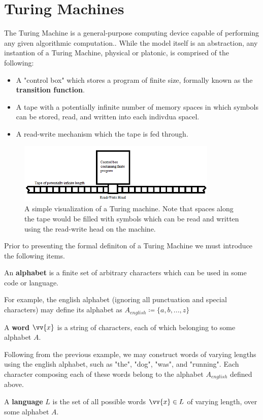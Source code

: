 \documentclass{article}
\begin{document}
\section{Turing Machines}
The Turing Machine is a general-purpose computing device capable of performing any given algorithmic computation.\cite{2}.  While the model itself is an abstraction, any instantion of a Turing Machine, physical or platonic, is comprised of the following:
\begin{itemize}
	\item A "control box" which stores a program of finite size, formally known as the \textbf{transition function}.
	\item A tape with a potentially infinite number of memory spaces in which symbols can be stored, read, and written into each indivdua spacel.
	\item A read-write mechanism which the tape is fed through. \cite{3}
\end{itemize}
\begin{figure}[h]
	\includegraphics[width=0.85\textwidth]{figure-3-1}
	\centering
	\setlength{\belowcaptionskip}{-10pt}
	\caption{A simple visualization of a Turing machine.  Note that spaces along the tape would be filled with symbols which can be read and written using the read-write head on the machine.}
\end{figure}

\noindent Prior to presenting the formal definiton of a Turing Machine we must introduce the following items.

\begin{defin}
	An \textbf{alphabet} is a finite set of arbitrary characters which can be used in some code or language.
\end{defin}
\noindent For example, the english alphabet (ignoring all punctuation and special characters) may define its alphabet as $A_{english} \coloneq \{ a, b, ... , z \}$
\begin{defin}
	A \textbf{word} $\vv{x}$ is a string of characters, each of which belonging to some alphabet $A$.
\end{defin}
\noindent Following from the previous example, we may construct words of varying lengths using the english alphabet, such as "the", "dog", "was", and "running".  Each character composing each of these words belong to the alphabet $A_{english}$ defined above.
\begin{defin}
	A \textbf{language} $L$ is the set of all possible words $\vv{x} \in L$ of varying length, over some alphabet $A$.
\end{defin}
\end{document}
